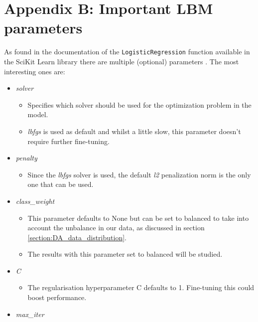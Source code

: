 

\chapter*{Appendix B: Important LBM parameters}

As found in the documentation of the \texttt{LogisticRegression} function available in the SciKit Learn library there are multiple (optional) parameters \citep{scikit_learn}.
The most interesting ones are:

\begin{itemize}
    \item \emph{solver}
    \begin{itemize}
        \item Specifies which solver should be used for the optimization problem in the model.
        \item \emph{lbfgs} is used as default and whilst a little slow, this parameter doesn't require further fine-tuning.
    \end{itemize}
    \item \emph{penalty}
    \begin{itemize}
        \item Since the \emph{lbfgs} solver is used, the default \emph{l2} penalization norm is the only one that can be used.
    \end{itemize}
    \item \emph{class\_weight}
    \begin{itemize}
        \item This parameter defaults to None but can be set to balanced to take into account the unbalance in our data, as discussed in section \ref{section:DA_data_distribution}.
        \item The results with this parameter set to balanced will be studied.
    \end{itemize}
    \item \emph{C}
    \begin{itemize}
        \item The regularisation hyperparameter C defaults to 1. Fine-tuning this could boost performance.
    \end{itemize}
    \item \emph{max\_iter}
    \begin{itemize}

\end{itemize}
\end{itemize}
